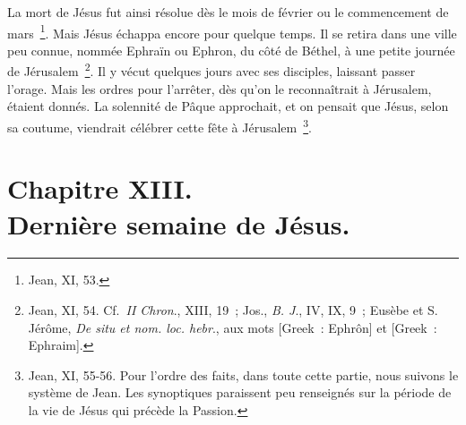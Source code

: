 \documentclass[french,twoside]{book} %
\newcommand\chapteropen{} %
\newcommand\chapterclose{} %
\begin{document}
La mort de Jésus fut ainsi résolue dès le mois de février ou le commencement de mars \footnote{Jean, XI, 53.}. Mais Jésus échappa encore pour quelque temps. Il se retira dans une ville peu connue, nommée Ephraïn ou Ephron, du côté de Béthel, à une petite journée de Jérusalem \footnote{ Jean, XI, 54. Cf. {\itshape II Chron}., XIII, 19 ; Jos., {\itshape B. J}., IV, IX, 9 ; Eusèbe et S. Jérôme, {\itshape De situ et nom. loc. hebr}., aux mots [Greek : Ephrôn] et [Greek : Ephraim].}. Il y vécut quelques jours avec ses disciples, laissant passer l’orage. Mais les ordres pour l’arrêter, dès qu’on le reconnaîtrait à Jérusalem, étaient donnés. La solennité de Pâque approchait, et on pensait que Jésus, selon sa coutume, viendrait célébrer cette fête à Jérusalem \footnote{Jean, XI, 55-56. Pour l’ordre des faits, dans toute cette partie, nous suivons le système de Jean. Les synoptiques paraissent peu renseignés sur la période de la vie de Jésus qui précède la Passion.}.
\chapterclose


\chapteropen
\chapter[{Chapitre XIII. Dernière semaine de Jésus.}]{Chapitre XIII.\\
Dernière semaine de Jésus.}\renewcommand{\leftmark}{Chapitre XIII.\\
Dernière semaine de Jésus.}
\end{document}

